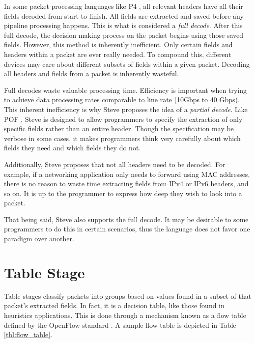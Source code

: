 In some packet processing languages like P4 \cite{p4_spec, p4_spec2}, all
relevant headers have all their fields decoded from start to finish. All fields
are extracted and saved before any pipeline processing happens. This is what is
considered a \textit{full decode}. After this full decode, the decision making
process on the packet begins using those saved fields. However, this method is
inherently inefficient. Only certain fields and headers within a packet are ever
really needed. To compound this, different devices may care about different
subsets of fields within a given packet. Decoding all headers and fields from a
packet is inherently wasteful.

Full decodes waste valuable processing time. Efficiency is important when trying
to achieve data processing rates comparable to line rate (10Gbps to 40 Gbps). This inherent
inefficiency is why Steve proposes the idea of a \textit{partial decode}. Like
POF \cite{pof, pof_fis, pof_impl}, Steve is designed to allow programmers to
specify the extraction of only specific fields rather than an entire header.
Though the specification may be verbose in some cases, it makes programmers
think very carefully about which fields they need and which fields they do not.

Additionally, Steve proposes that not all headers need to be decoded. For
example, if a networking application only needs to forward using MAC addresses,
there is no reason to waste time extracting fields from IPv4 or IPv6 headers,
and so on. It is up to the programmer to express how deep they wish to look into a packet.

That being said, Steve also supports the full decode. It may be desirable to
some programmers to do this in certain scenarios, thus the language does not
favor one paradigm over another.

\section{Table Stage} \label{table_desc}

Table stages classify packets into groups based on values found in a subset of
that packet's extracted fields. In fact, it is a decision table, like those
found in heuristics applications. This is done through a mechanism known as a
flow table defined by the OpenFlow standard \cite{openflow_spec}. A sample flow table is depicted in Table \ref{tbl:flow_table}.

